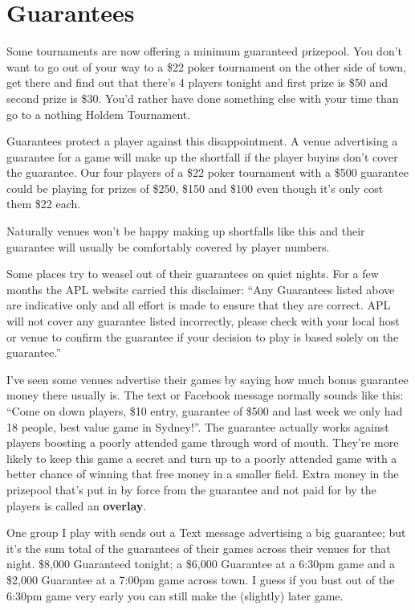 \section{Guarantees}

Some tournaments are now offering a minimum guaranteed prizepool. You
don't want to go out of your way to a \$22 poker tournament on the
other side of town, get there and find out that there's 4 players tonight
and first prize is \$50 and second prize is \$30. You'd rather have
done something else with your time than go to a nothing Holdem Tournament.

Guarantees protect a player against this disappointment. A venue
advertising a guarantee for a game will make up the shortfall if the
player buyins don't cover the guarantee. Our four players of a \$22
poker tournament with a \$500 guarantee could be playing for prizes
of \$250, \$150 and \$100 even though it's only cost them \$22 each.

Naturally venues won't be happy making up shortfalls like this and
their guarantee will usually be comfortably covered by player numbers.

Some places try to weasel out of their guarantees on quiet nights.
For a few months the APL website carried this disclaimer:
``Any Guarantees listed above are indicative only and all effort
is made to ensure that they are correct. APL will not cover
any guarantee listed incorrectly, please check with your local
host or venue to confirm the guarantee if your decision to
play is based solely on the guarantee.''

I've seen some venues advertise their games by saying how much bonus
guarantee money there usually is. The text or Facebook message
normally sounds like this: ``Come on down players, \$10 entry,
guarantee of \$500 and last week we only had 18 people, best value
game in Sydney!''. The guarantee actually works against players
boosting a poorly attended game through word of
mouth. They're more likely to keep this game a secret and turn up to a
poorly attended game with a better chance of winning that free money
in a smaller field. Extra money in the prizepool that's put in by force
from the guarantee and not paid for by the players is called an
\textbf{overlay}.

One group I play with sends out a Text message advertising a big
guarantee; but it's the sum total of the guarantees of their games
across their venues for that night. \$8,000 Guaranteed tonight; a
\$6,000 Guarantee at a 6:30pm game and a \$2,000 Guarantee at
a 7:00pm game across town. I guess if you bust out of the 6:30pm game
very early you can still make the (slightly) later game.

